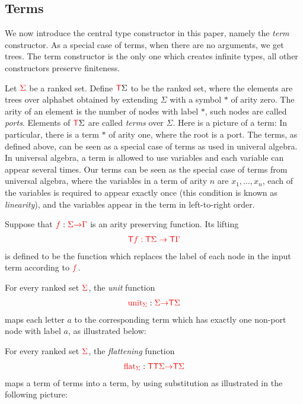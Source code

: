 \subsection{Terms}
We now introduce the  central type constructor in this paper, namely  the \emph{term} constructor. As a special case of terms, when there are no arguments, we get trees. The term constructor is the only one which creates infinite types, all other constructors preserve finiteness.


\datatypefigure
{Let ${\color{red}{\Sigma}}$ be a ranked set. Define  ${\color{red}{\mathsf T}} \Sigma$ to be the ranked set, where the  elements are trees over alphabet obtained by extending $\Sigma$ with a symbol $*$ of arity zero. The arity of an element is the number of nodes with label $*$, such nodes are called \emph{ports}. Elements of ${\color{red}{\mathsf T}} \Sigma$ are called \emph{terms} over $\Sigma$. Here is a picture of a term:
    In particular, there is a term $*$ of arity one, where the root is a port. 
    The terms, as defined above, can be seen as a special case of terms as used in univeral algebra.  In universal algebra, a term is allowed to use variables and each variable can appear several times. Our terms can be seen as the special case of terms from universal algebra, where the variables in a term of arity $n$ are $x_1,\ldots,x_n$, each of the variables is required to appear exactly once (this condition is known as \emph{linearity}), and the variables appear in the term in  left-to-right order.
}
{
        \item Suppose that ${\color{red}{f}} : {\color{red}{\Sigma}} {\color{red}{\to}} {\color{red}{\Gamma}}$ is  an arity preserving function. Its lifting 
        \begin{align*}
        {\color{red}{{\color{red}{\mathsf T}}f : {\color{red}{\mathsf T}}\Sigma \to {\color{red}{\mathsf T}}\Gamma}}
        \end{align*}
        is defined to be the function which replaces the label of each node in the input term according to ${\color{red}{f}}$. 
        \item For every ranked set ${\color{red}{\Sigma}}$, the \emph{unit} function
        \begin{align*}
            {\color{red}{\mathrm{unit}}}_{\color{red}{\Sigma}} : {\color{red}{\Sigma}} {\color{red}{\to}} {\color{red}{\mathsf T}} {\color{red}{\Sigma}}
        \end{align*}
        maps each letter $a$ to the corresponding term which has exactly one non-port node with label $a$, as illustrated below:

        \item \label{it:flattening} For every ranked set ${\color{red}{\Sigma}}$, the \emph{flattening} function
        \begin{align*}
            {\color{red}{\mathrm{flat}}}_{\color{red}{\Sigma}} : {\color{red}{\mathsf T}} {\color{red}{\mathsf T}} {\color{red}{\Sigma}} {\color{red}{\to}} {\color{red}{\mathsf T}} {\color{red}{\Sigma}}
        \end{align*}
        maps a term of terms into a term, by using substitution as illustrated in the following picture:  
    }

